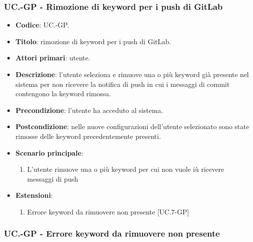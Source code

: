 	\subsubsection{UC\theuccount.\thesubuccount-GP - Rimozione di keyword per i push di GitLab}

	\begin{itemize}
		\item \textbf{Codice}: UC\theuccount.\thesubuccount-GP.
		\item \textbf{Titolo}: rimozione di keyword per i push di GitLab.
		\item \textbf{Attori primari}: utente.
		\item \textbf{Descrizione}: l’utente seleziona e rimuove una o più keyword già presente nel sistema per non ricevere la notifica di push in
		cui i messaggi di commit contengono la keyword rimossa.
		\item \textbf{Precondizione}:  l’utente ha acceduto al sistema.
		\item \textbf{Postcondizione}: nelle nuove configurazioni dell'utente selezionato sono state rimosse delle keyword precedentemente presenti.
		\item \textbf{Scenario principale}:
		\begin{enumerate}
			\item L'utente rimuove una o più keyword per cui non vuole iù ricevere messaggi di push
		\end{enumerate}
		\item \textbf{Estensioni}:
		\begin{enumerate}
			\item Errore keyword da rimuovere non presente [UC\theuccount.7-GP]
		\end{enumerate}
	\end{itemize}

	\subsubsection{UC\theuccount.\thesubuccount-GP - Errore keyword da rimuovere non presente}

